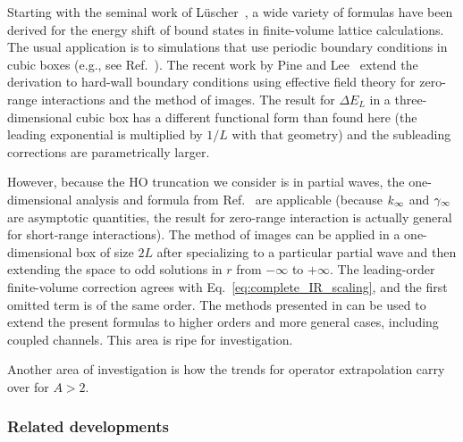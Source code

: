 	Starting with the seminal work of L\"uscher~\cite{Luscher:1985dn}, a
	wide variety of formulas have been derived for the energy shift of
	bound states in finite-volume lattice calculations.  The usual
	application is to simulations that use periodic boundary conditions in
	cubic boxes (e.g., see Ref.~\cite{Konig:2011ti}).  The recent work by
	Pine and Lee~\cite{Lee:2010km,Pine:2012zv} extend the derivation to
	hard-wall boundary conditions using effective field theory for
	zero-range interactions and the method of images.  The result for
	$\Delta E_L$ in a three-dimensional cubic box has a different
	functional form than found here (the leading exponential is multiplied
	by $1/L$ with that geometry) and the subleading corrections are
	parametrically larger.

	However, because the HO truncation we consider is in partial waves,
	the one-dimensional analysis and formula from Ref.~\cite{Pine:2012zv}
	are applicable (because $k_{\infty}$ and $\gamma_\infty$ are asymptotic quantities,
	the result for zero-range interaction is actually general for
	short-range interactions).  The method of images can be applied in a
	one-dimensional box of size $2L$ after specializing to a particular
	partial wave and then extending the space to odd solutions in $r$ from
	$-\infty$ to $+\infty$.  The leading-order finite-volume correction
	agrees with Eq.~\eqref{eq:complete_IR_scaling}, and the first omitted term
	is of the same order.
	The methods presented in \cite{Lee:2010km,Pine:2012zv}
	can be used to extend the present formulas to higher
	orders and more general cases, including coupled channels.  This area
	is ripe for investigation.

	Another area of investigation is how the trends for operator extrapolation
	carry over for $A > 2$.

	\medskip
	\subsubsection{Related developments}

